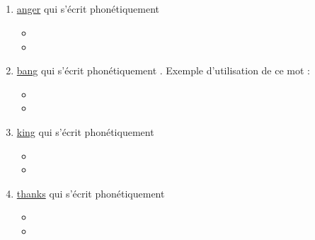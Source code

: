 \subsection{}\label{sec:ing}

\begin{enumerate}
\item \href{http://www.wordreference.com/enfr/anger}{anger} qui s'écrit phonétiquement \href{https://en.oxforddictionaries.com/definition/anger}{}

  \begin{itemize}
  \item{}
  \item{}
  \end{itemize}


\item \href{http://www.wordreference.com/enfr/bang}{bang} qui s'écrit phonétiquement \href{https://en.oxforddictionaries.com/definition/bang}{}. Exemple d'utilisation de ce
  mot :
  
  \begin{itemize}
  \item{}
  \item{}
  \end{itemize}


\item \href{http://www.wordreference.com/enfr/king}{king} qui s'écrit phonétiquement \href{https://en.oxforddictionaries.com/definition/king}{}

  \begin{itemize}
  \item{}
  \item{}
  \end{itemize}


\item \href{http://www.wordreference.com/enfr/thanks}{thanks} qui s'écrit phonétiquement \href{https://en.oxforddictionaries.com/definition/thanks}{}
  
  \begin{itemize}
  \item{}
  \item{}
  \end{itemize}


\end{enumerate}

